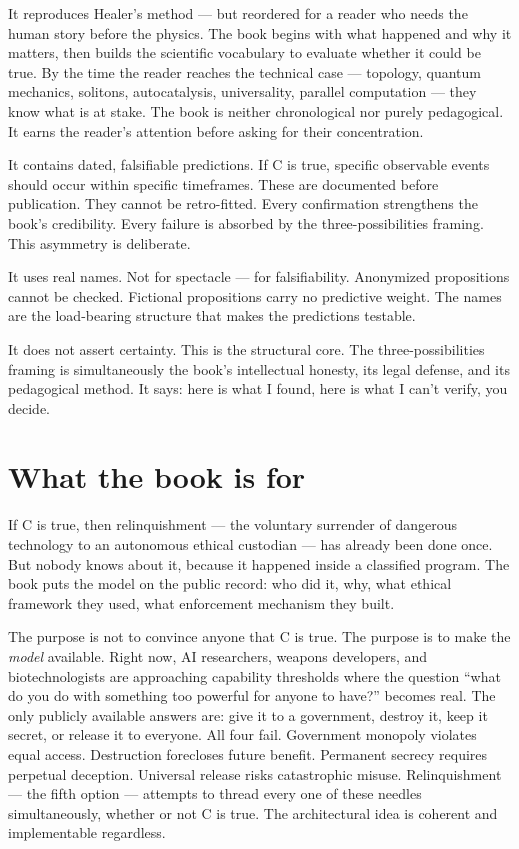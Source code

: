It reproduces Healer's method --- but reordered for a reader who needs the human story before the physics. The book begins with what happened and why it matters, then builds the scientific vocabulary to evaluate whether it could be true. By the time the reader reaches the technical case --- topology, quantum mechanics, solitons, autocatalysis, universality, parallel computation --- they know what is at stake. The book is neither chronological nor purely pedagogical. It earns the reader's attention before asking for their concentration.

It contains dated, falsifiable predictions. If C is true, specific observable events should occur within specific timeframes. These are documented before publication. They cannot be retro-fitted. Every confirmation strengthens the book's credibility. Every failure is absorbed by the three-possibilities framing. This asymmetry is deliberate.

It uses real names. Not for spectacle --- for falsifiability. Anonymized propositions cannot be checked. Fictional propositions carry no predictive weight. The names are the load-bearing structure that makes the predictions testable.

It does not assert certainty. This is the structural core. The three-possibilities framing is simultaneously the book's intellectual honesty, its legal defense, and its pedagogical method. It says: here is what I found, here is what I can't verify, you decide.

\section*{What the book is for}
\label{front:what-the-book-is-for}

If C is true, then relinquishment --- the voluntary surrender of dangerous technology to an autonomous ethical custodian --- has already been done once. But nobody knows about it, because it happened inside a classified program. The book puts the model on the public record: who did it, why, what ethical framework they used, what enforcement mechanism they built.

The purpose is not to convince anyone that C is true. The purpose is to make the \textit{model} available. Right now, AI researchers, weapons developers, and biotechnologists are approaching capability thresholds where the question ``what do you do with something too powerful for anyone to have?'' becomes real. The only publicly available answers are: give it to a government, destroy it, keep it secret, or release it to everyone. All four fail. Government monopoly violates equal access. Destruction forecloses future benefit. Permanent secrecy requires perpetual deception. Universal release risks catastrophic misuse. Relinquishment --- the fifth option --- attempts to thread every one of these needles simultaneously, whether or not C is true. The architectural idea is coherent and implementable regardless.

